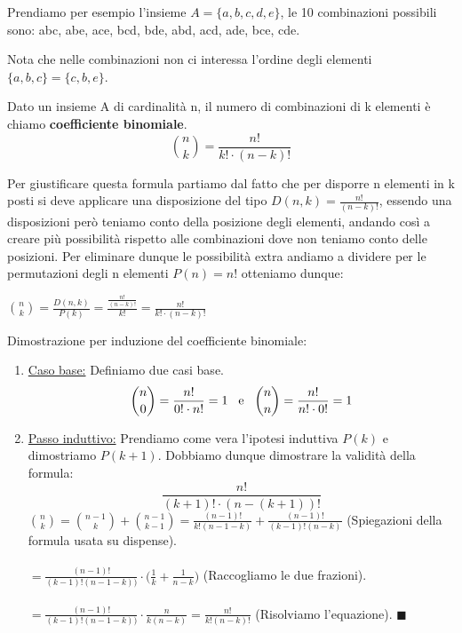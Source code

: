 \begin{example}
Prendiamo per esempio l'insieme $A = \{a,b,c,d,e\}$, le 10 combinazioni possibili sono:
abc, abe, ace, bcd, bde, abd, acd, ade, bce, cde.
\end{example}

\begin{note}
Nota che nelle combinazioni non ci interessa l'ordine degli elementi $\{a,b,c\} = \{c,b,e\}$.
\end{note}

\begin{definition}
Dato un insieme A di cardinalità n, il numero di combinazioni di k elementi è chiamo \textbf{coefficiente binomiale}.
\begin{equation}
    \binom{n}{k} = \frac{\displaystyle n!}{\displaystyle k! \cdot (n - k)!}
\end{equation}
\end{definition}

\hspace{-15pt}Per giustificare questa formula partiamo dal fatto che per disporre n elementi in k posti si deve applicare una disposizione del tipo $D(n,k) = \frac{n!}{(n - k)!}$, essendo una disposizioni però teniamo conto della posizione degli elementi, andando così a creare più possibilità rispetto alle combinazioni dove non teniamo conto delle posizioni. Per eliminare dunque le possibilità extra andiamo a dividere per le permutazioni degli n elementi $P(n) = n!$ otteniamo dunque:
\begin{center}
    $\binom{n}{k} = \frac{D(n,k)}{P(k)} = \frac{\frac{n!}{(n-k)!}}{k!} = \frac{n!}{k! \cdot (n - k)!}$
\end{center}

\begin{demostration}
    Dimostrazione per induzione del coefficiente binomiale:
    \begin{enumerate}
        \item \underline{Caso base:} Definiamo due casi base.
        \[\binom{n}{0} = \frac{n!}{0! \cdot n!} = 1 \hspace{.3cm}\text{e}\hspace{.3cm} \binom{n}{n} = \frac{n!}{n! \cdot 0!} = 1\]
        \item \underline{Passo induttivo:} Prendiamo come vera l'ipotesi induttiva $P(k)$ e dimostriamo $P(k + 1)$. Dobbiamo dunque dimostrare la validità della formula: \[\frac{n!}{(k+1)! \cdot (n - (k+1))!}\]
        $\binom{n}{k} = \binom{n - 1}{k} + \binom{n - 1}{k - 1} = \frac{(n-1)!}{k! (n - 1 - k)} + \frac{(n-1)!}{(k - 1)! (n - k)}$ (Spiegazioni della formula usata su dispense).\\\\
        $= \frac{(n-1)!}{(k-1)!(n-1-k))} \cdot \bigl(\frac{1}{k} + \frac{1}{n-k} \bigr)$ (Raccogliamo le due frazioni).\\\\
        $= \frac{(n-1)!}{(k-1)!(n-1-k))} \cdot \frac{n}{k(n-k)} = \frac{n!}{k!(n-k)!}$ (Risolviamo l'equazione). $\blacksquare$
    \end{enumerate}
\end{demostration}

